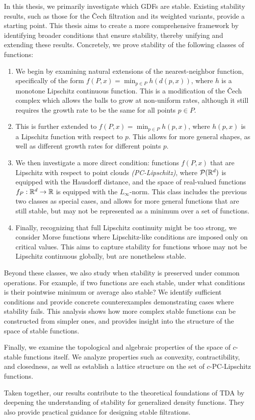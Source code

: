 In this thesis, we primarily investigate which GDFs are stable. Existing
stability results, such as those for the \v{C}ech filtration and its weighted
variants, provide a starting point. This thesis aims to create a more
comprehensive framework by identifying broader conditions that ensure stability,
thereby unifying and extending these results. Concretely, we prove stability of
the following classes of functions:
\begin{enumerate}
    \item We begin by examining natural extensions of the nearest-neighbor
        function, specifically of the form $f(P, x) = \min_{p \in P} h(d(p,
        x))$, where $h$ is a monotone Lipschitz continuous function. This
        is a modification of the \v{C}ech complex which allows the balls to grow
        at non-uniform rates, although it still requires the growth rate to be
        the same for all points $p \in P$.
    \item This is further extended to $f(P, x) = \min_{p \in P} h(p, x)$, where
        $h(p, x)$ is a Lipschitz function with respect to $p$. This allows for
        more general shapes, as well as different growth rates for different
        points $p$.
    \item We then investigate a more direct condition: functions $f(P, x)$ that
        are Lipschitz with respect to point clouds \emph{(PC-Lipschitz)}, where
        $\mathcal{P}(\mathbb{R}^d)$ is equipped with the Hausdorff distance, and the
        space of real-valued functions $f_P : \mathbb{R}^d \to \mathbb{R}$ is equipped with the
        $L_\infty$-norm. This class includes the previous two classes as
        special cases, and allows for more general functions that are still
        stable, but may not be represented as a minimum over a set of
        functions.
    \item Finally, recognizing that full Lipschitz continuity might be too
        strong, we consider Morse functions where Lipschitz-like conditions are
        imposed only on critical values. This aims to capture stability for
        functions whose may not be Lipschitz continuous globally, but are
        nonetheless stable.
\end{enumerate}

Beyond these classes, we also study when stability is preserved under common
operations. For example, if two functions are each stable, under what conditions
is their pointwise minimum or average also stable? We identify sufficient
conditions and provide concrete counterexamples demonstrating cases where
stability fails. This analysis shows how more complex stable functions can be
constructed from simpler ones, and provides insight into the structure of the
space of stable functions.

Finally, we examine the topological and algebraic properties of the space of
$c$-stable functions itself. We analyze properties such as convexity,
contractibility, and closedness, as well as establish a lattice structure on the
set of $c$-PC-Lipschitz functions.

Taken together, our results contribute to the theoretical foundations of TDA by
deepening the understanding of stability for generalized density functions. They
also provide practical guidance for designing stable filtrations.